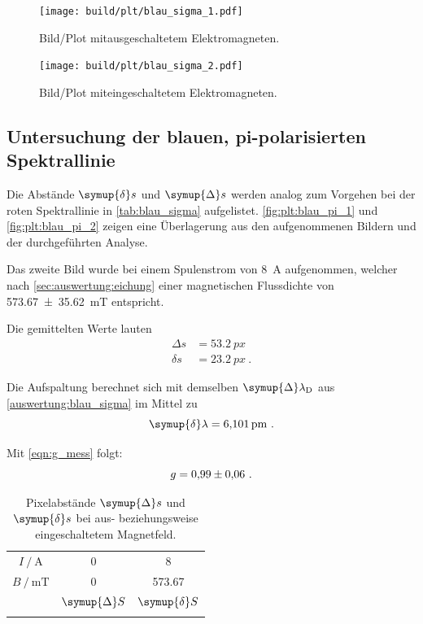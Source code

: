 \begin{figure}[H]
    \centering
    \texttt{[image: build/plt/blau\_sigma\_1.pdf]}
    \caption{Bild/Plot mitausgeschaltetem Elektromagneten.}
    \label{fig:plt:blau_sigma_1}
\end{figure}

\begin{figure}[H]
    \centering
    \texttt{[image: build/plt/blau\_sigma\_2.pdf]}
    \caption{Bild/Plot miteingeschaltetem Elektromagneten.}
    \label{fig:plt:blau_sigma_2}
\end{figure}


\FloatBarrier
\subsection{Untersuchung der blauen, pi-polarisierten Spektrallinie}
Die Abstände $\symup{\delta} s$ und $\symup{\Delta} s$ werden analog zum Vorgehen bei der roten Spektrallinie
in \autoref{tab:blau_sigma} aufgelistet.
\autoref{fig:plt:blau_pi_1} und \autoref{fig:plt:blau_pi_2} zeigen eine Überlagerung
aus den aufgenommenen Bildern und der durchgeführten Analyse.

Das zweite Bild wurde bei einem Spulenstrom von \SI{8}{\ampere} aufgenommen,
welcher nach \autoref{sec:auswertung:eichung} einer magnetischen Flussdichte von \SI{573.67 \pm 35.62}{\milli\tesla} entspricht.

Die gemittelten Werte lauten
\begin{align*}
    Δs &= \SI{53.2}{px} \\
    δs &= \SI{23.2}{px} \ .
\end{align*}


Die Aufspaltung berechnet sich
mit demselben $\symup{\Delta}\lambda_\text{D}$ aus \autoref{auswertung:blau_sigma}
im Mittel zu
\[
    \symup{\delta} \lambda = \SI{6.101}{\pico\meter} \ .
\]

Mit \autoref{eqn:g_mess} folgt:
\[
    g = \num{0.99 \pm 0.06} \ .
\]

\begin{table}[H]
    \centering
    \caption{Pixelabstände $\symup{\Delta} s$ und $\symup{\delta} s$ bei aus- beziehungsweise eingeschaltetem Magnetfeld.}
    \label{tab:blau_pi}
    \begin{tabular}{S S S}
        \toprule
        {$I \mathbin{/} \si{\ampere}$} & 0 & 8 \\
        {$B \mathbin{/} \si{\milli\tesla}$} & 0 & 573.67  \\
        \midrule
        & {$\symup{\Delta} S$} & {$\symup{\delta} S$} \\
        \midrule
        \bottomrule
    \end{tabular}
\end{table}

